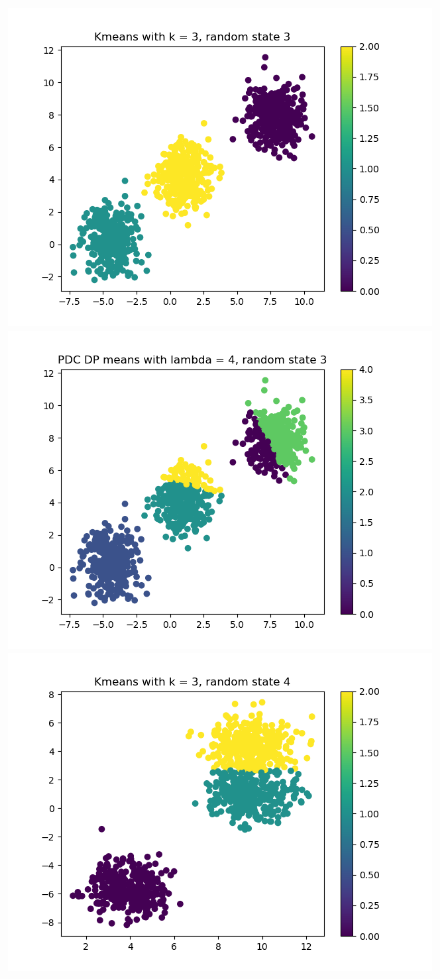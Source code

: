 \documentclass[12pt]{article}
\begin{document}
\begin{figure}
\begin{minipage}{0.5\textwidth}
    \includegraphics[scale=0.4]{images/task2_drs_rs3__k3}
    \end{minipage}
    \begin{minipage}{0.5\textwidth}
    \centering
    \includegraphics[scale=0.4]{images/task2_drs_rs3__l4}
    \end{minipage}
    \begin{minipage}{0.5\textwidth}
    \centering
    \includegraphics[scale=0.4]{images/task2_drs_rs4__k3}

\end{minipage}
\end{figure}
\end{document}
